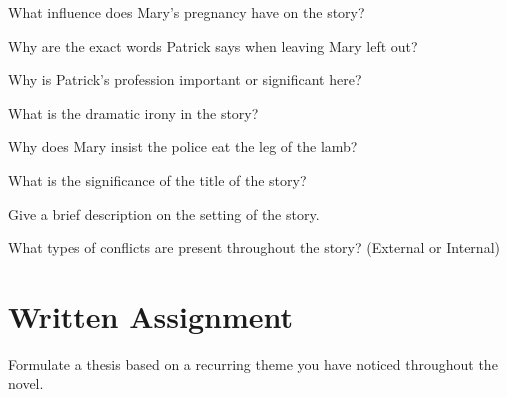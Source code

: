 \documentclass[12pt]{article} %
\begin{document}
\begin{qstn}
  What influence does Mary's pregnancy have on the story?
\end{qstn}

\begin{qstn}
  Why are the exact words Patrick says when leaving Mary left out?
\end{qstn}

\begin{qstn}
  Why is Patrick's profession important or significant here?
\end{qstn}

\begin{qstn}
  What is the dramatic irony in the story?
\end{qstn}

\begin{qstn}
  Why does Mary insist the police eat the leg of the lamb?
\end{qstn}

\begin{qstn}
  What is the significance of the title of the story?
\end{qstn}

\begin{qstn}
  Give a brief description on the setting of the story.
\end{qstn}

\begin{qstn}
  What types of conflicts are present throughout the story? (External or Internal)
\end{qstn}

\section*{Written Assignment}
Formulate a thesis based on a recurring theme you have noticed throughout the novel.
\end{document}
